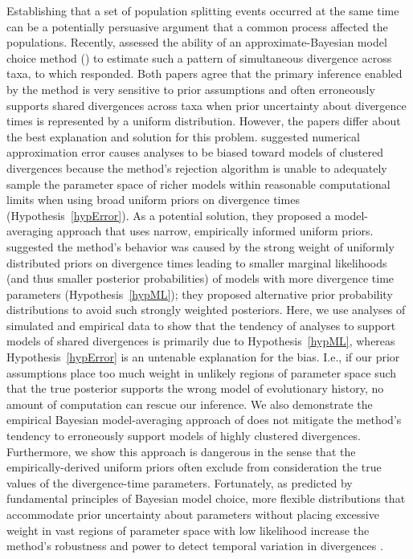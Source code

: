 Establishing that a set of population splitting events occurred at the same
time can be a potentially persuasive argument that a common process affected
the populations.
Recently, \citet{Oaks2012} assessed the ability of an approximate-Bayesian
model choice method (\msb) to estimate such a pattern of simultaneous
divergence across taxa, to which \citet{Hickerson2013} responded.
Both papers agree that the primary inference enabled by the method is very
sensitive to prior assumptions and often erroneously supports shared
divergences across taxa when prior uncertainty about divergence times
is represented by a uniform distribution.
However, the papers differ about the best explanation and solution for this
problem.
\citet{Hickerson2013} suggested numerical approximation error causes \msb
analyses to be biased toward models of clustered divergences because the
method's rejection algorithm is unable to adequately sample the parameter space
of richer models within reasonable computational limits when using broad
uniform priors on divergence times (Hypothesis~\ref{hypError}).
As a potential solution, they proposed a model-averaging approach that uses
narrow, empirically informed uniform priors.
\citet{Oaks2012} suggested the method's behavior was caused by the strong
weight of uniformly distributed priors on divergence times leading to smaller
marginal likelihoods (and thus smaller posterior probabilities) of models with
more divergence time parameters (Hypothesis~\ref{hypML}); they proposed
alternative prior probability distributions to avoid such strongly weighted
posteriors.
Here, we use analyses of simulated and empirical data to show that the tendency
of \msb analyses to support models of shared divergences is primarily due to
Hypothesis~\ref{hypML}, whereas Hypothesis~\ref{hypError} is an untenable
explanation for the bias.
I.e., if our prior assumptions place too much weight in unlikely regions of
parameter space such that the true posterior supports the wrong model of
evolutionary history, no amount of computation can rescue our inference. 
We also demonstrate the empirical Bayesian model-averaging approach of
\citet{Hickerson2013} does not mitigate the method's tendency to erroneously
support models of highly clustered divergences.
Furthermore, we show this approach is dangerous in the sense that the
empirically-derived uniform priors often exclude from consideration the true
values of the divergence-time parameters.
Fortunately, as predicted by fundamental principles of Bayesian model choice,
more flexible distributions that accommodate prior uncertainty about parameters
without placing excessive weight in vast regions of parameter space with low
likelihood increase the method's robustness and power to detect temporal
variation in divergences \citep{Oaks2014dpp}.
